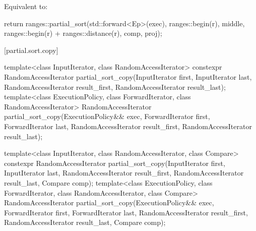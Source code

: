 \begin{itemdescr}
\pnum
\effects
Equivalent to:
\begin{codeblock}
return ranges::partial_sort(std::forward<Ep>(exec), ranges::begin(r), middle,
                            ranges::begin(r) + ranges::distance(r),
                            comp, proj);
\end{codeblock}
\end{itemdescr}

[partial.sort.copy]{}

%
\begin{itemdecl}
template<class InputIterator, class RandomAccessIterator>
  constexpr RandomAccessIterator
    partial_sort_copy(InputIterator first, InputIterator last,
                      RandomAccessIterator result_first,
                      RandomAccessIterator result_last);
template<class ExecutionPolicy, class ForwardIterator, class RandomAccessIterator>
  RandomAccessIterator
    partial_sort_copy(ExecutionPolicy&& exec,
                      ForwardIterator first, ForwardIterator last,
                      RandomAccessIterator result_first,
                      RandomAccessIterator result_last);

template<class InputIterator, class RandomAccessIterator,
         class Compare>
  constexpr RandomAccessIterator
    partial_sort_copy(InputIterator first, InputIterator last,
                      RandomAccessIterator result_first,
                      RandomAccessIterator result_last,
                      Compare comp);
template<class ExecutionPolicy, class ForwardIterator, class RandomAccessIterator,
         class Compare>
  RandomAccessIterator
    partial_sort_copy(ExecutionPolicy&& exec,
                      ForwardIterator first, ForwardIterator last,
                      RandomAccessIterator result_first,
                      RandomAccessIterator result_last,
                      Compare comp);


\end{itemdecl}

